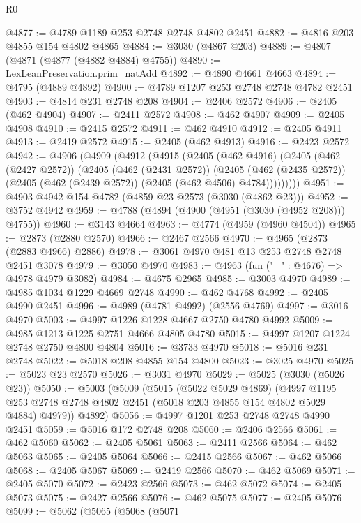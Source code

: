 \begin{lexlean}{R0}
\begin{coremodule}
@4877 := @4789 @1189 @253 @2748 @2748 @4802 @2451
@4882 := @4816 @203 @4855 @154 @4802 @4865
@4884 := @3030 (@4867 @203)
@4889 := @4807 (@4871 (@4877 (@4882 @4884) @4755))
@4890 := LexLeanPreservation.prim_natAdd
@4892 := @4890 @4661 @4663
@4894 := @4795 (@4889 @4892)
@4900 := @4789 @1207 @253 @2748 @2748 @4782 @2451
@4903 := @4814 @231 @2748 @208
@4904 := @2406 @2572
@4906 := @2405 (@462 @4904)
@4907 := @2411 @2572
@4908 := @462 @4907
@4909 := @2405 @4908
@4910 := @2415 @2572
@4911 := @462 @4910
@4912 := @2405 @4911
@4913 := @2419 @2572
@4915 := @2405 (@462 @4913)
@4916 := @2423 @2572
@4942 := @4906
    (@4909
      (@4912
        (@4915
          (@2405
            (@462 @4916)
            (@2405
              (@462 (@2427 @2572))
              (@2405
                (@462 (@2431 @2572))
                (@2405
                  (@462 (@2435 @2572))
                  (@2405 (@462 (@2439 @2572)) (@2405 (@462 @4506) @4784)))))))))
@4951 := @4903 @4942 @154 @4782 (@4859 @23 @2573 (@3030 (@4862 @23)))
@4952 := @3752 @4942
@4959 := @4788 (@4894 (@4900 (@4951 (@3030 (@4952 @208))) @4755))
@4960 := @3143 @4664
@4963 := @4774 (@4959 (@4960 @4504))
@4965 := @2873 (@2880 @2570)
@4966 := @2467 @2566
@4970 := @4965 (@2873 (@2883 @4966) @2886)
@4978 := @3061 @4970 @481 @13 @253 @2748 @2748 @2451 @3078
@4979 := @3050 @4970
@4983 := @4963 (fun ("_" : @4676) => @4978 @4979 @3082)
@4984 := @4675 @2965
@4985 := @3003 @4970
@4989 := @4985 @1034 @1229 @4669 @2748
@4990 := @462 @4768
@4992 := @2405 @4990 @2451
@4996 := @4989 (@4781 @4992) (@2556 @4769)
@4997 := @3016 @4970
@5003 := @4997 @1226 @1228 @4667 @2750 @4780 @4992
@5009 := @4985 @1213 @1225 @2751 @4666 @4805 @4780
@5015 := @4997 @1207 @1224 @2748 @2750 @4800 @4804
@5016 := @3733 @4970
@5018 := @5016 @231 @2748
@5022 := @5018 @208 @4855 @154 @4800
@5023 := @3025 @4970
@5025 := @5023 @23 @2570
@5026 := @3031 @4970
@5029 := @5025 (@3030 (@5026 @23))
@5050 := @5003
    (@5009
      (@5015
        (@5022 @5029 @4869)
        (@4997 @1195 @253 @2748 @2748 @4802 @2451 (@5018 @203 @4855 @154 @4802 @5029 @4884) @4979))
      @4892)
@5056 := @4997 @1201 @253 @2748 @2748 @4990 @2451
@5059 := @5016 @172 @2748 @208
@5060 := @2406 @2566
@5061 := @462 @5060
@5062 := @2405 @5061
@5063 := @2411 @2566
@5064 := @462 @5063
@5065 := @2405 @5064
@5066 := @2415 @2566
@5067 := @462 @5066
@5068 := @2405 @5067
@5069 := @2419 @2566
@5070 := @462 @5069
@5071 := @2405 @5070
@5072 := @2423 @2566
@5073 := @462 @5072
@5074 := @2405 @5073
@5075 := @2427 @2566
@5076 := @462 @5075
@5077 := @2405 @5076
@5099 := @5062
    (@5065
      (@5068
        (@5071

\end{coremodule}
\end{lexlean}
